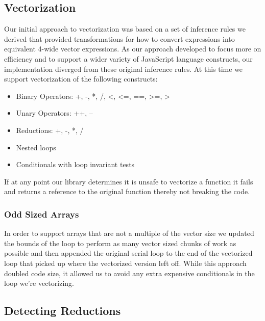 \documentclass[conference]{IEEEtran}
\begin{document}
\subsection{Vectorization}
Our initial approach to vectorization was based on a set of inference rules we
derived that provided transformations for how to convert expressions into
equivalent 4-wide vector expressions. As our approach developed to focus more
on efficiency and to support a wider variety of JavaScript language constructs,
our implementation diverged from these original inference rules. At this time
we support vectorization of the following constructs:
\begin{itemize}
\item Binary Operators: +, -, *, /, \textless, \textless=, ==, \textgreater=, >
\item Unary Operators: ++, --
\item Reductions: +, -, *, /
\item Nested loops
\item Conditionals with loop invariant tests
\end{itemize}
If at any point our library determines it is unsafe to vectorize a function it
fails and returns a reference to the original function thereby not breaking the
code.

\subsubsection{Odd Sized Arrays}
In order to support arrays that are not a multiple of the vector size we
updated the bounds of the loop to perform as many vector sized chunks of work
as possible and then appended the original serial loop to the end of the
vectorized loop that picked up where the vectorized version left off. While
this approach doubled code size, it allowed us to avoid any extra expensive
conditionals in the loop we're vectorizing.


\subsection{Detecting Reductions}
\end{document}
